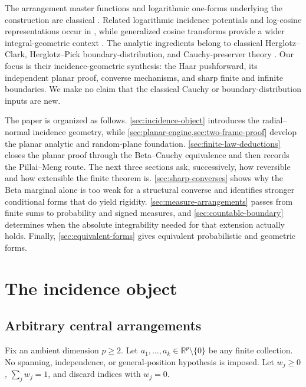 \documentclass[11pt]{article}
\numberwithin{equation}{section}
\theoremstyle{thmstyleone}%
\theoremstyle{thmstyletwo}%
\let\cref\autoref
\newcommand{\R}{\mathbb R}
\begin{document}
The arrangement master functions and logarithmic one-forms underlying the
construction are classical \cite{cohen-denham-falk-varchenko-2012}.
Related logarithmic incidence potentials and log-cosine representations
occur in \cite{hejhal-2004,kalton-koldobsky-yaskin-yaskina-2007}, while
generalized cosine transforms provide a wider integral-geometric context
\cite{rubin-2008}.
The analytic ingredients belong to classical Herglotz--Clark,
Herglotz--Pick boundary-distribution, and Cauchy-preserver theory
\cite{clark-1972,pitman-williams-1967,williams-1969,letac-1977,
poltoratski-1996,aizenman-warzel-2015}.  Our focus is their
incidence-geometric synthesis: the
Haar pushforward, its independent planar proof, converse mechanisms, and
sharp finite and infinite boundaries.  We make no claim that the classical
Cauchy or boundary-distribution inputs are new.

The paper is organized as follows.
\cref{sec:incidence-object} introduces the radial--normal incidence geometry,
while \cref{sec:planar-engine,sec:two-frame-proof} develop the planar analytic
and random-plane foundation.  \cref{sec:finite-law-deductions} closes the
planar proof through the Beta--Cauchy equivalence and then records the
Pillai--Meng route.  The next three sections ask, successively, how reversible
and how extensible the finite theorem is.  \cref{sec:sharp-converses} shows why
the Beta marginal alone is too weak for a structural converse and identifies
stronger conditional forms that do yield rigidity.  \cref{sec:measure-arrangements}
passes from finite sums to probability and signed measures, and
\cref{sec:countable-boundary} determines when the absolute integrability needed
for that extension actually holds.  Finally, \cref{sec:equivalent-forms} gives
equivalent probabilistic and geometric forms.

\section{The incidence object}
\label{sec:incidence-object}

\subsection{Arbitrary central arrangements}

Fix an ambient dimension \(p\geq2\).  Let
\(a_1,\ldots,a_k\in\R^p\setminus\{0\}\) be any finite collection.  No
spanning, independence, or general-position hypothesis is imposed.  Let
\(w_j\geq0\), \(\sum_jw_j=1\), and discard indices with \(w_j=0\).
\end{document}
